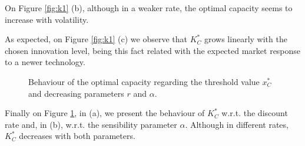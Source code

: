 On Figure \ref{fig:k1} (b), although in a weaker rate, the optimal capacity seems to increase with volatility.

As expected, on Figure \ref{fig:k1} (c) we observe that $K^*_C$ grows linearly with the chosen innovation level, being this fact related with the expected market response to a newer technology.



\begin{figure}[!htb]
	\begin{subfigmatrix}{2}
	\end{subfigmatrix}
	\caption{Behaviour of the optimal capacity regarding the threshold value $x^*_C$ and decreasing parameters $r$ and $\alpha$.}
	\label{fig:k2}
\end{figure}

Finally on Figure \ref{fig:k2}, in (a), we present the behaviour of $K^*_C$ w.r.t. the discount rate and, in (b), w.r.t. the sensibility parameter $\alpha$. Although in different rates, $K_C^*$ decreases with both parameters.
 
